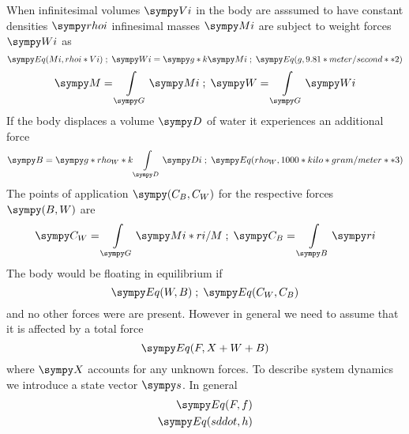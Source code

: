 When infinitesimal volumes $\s{Vi}$ in the body are asssumed to have constant densities $\s{rhoi}$ infinesimal masses $\s{Mi}$ are subject to weight forces $\s{Wi}$ as
\begin{equation*}
\s{Eq(Mi, rhoi * Vi)} \;;\; \s{Wi} =  \s{g * k} \s{Mi} \;;\; \s{Eq(g, 9.81 * meter/second**2)}
\end{equation*}
\begin{equation}
\s{M} = \int\limits_{\s{G}} \s{Mi} \;;\; \s{W} = \int\limits_{\s{G}} \s{Wi}
\label{eq:maw}
\end{equation}
If the body displaces a volume $\s{D}$ of water it experiences an additional force
$$\s{B} = \s{g * rho_W *  k}\int\limits_{\s{D}} \s{Di} \;;\; \s{Eq(rho_W, 1000 * kilo * gram/meter**3)}$$
The points of application $\s{(C_B, C_W)}$ for the respective forces $\s{(B, W)}$ are
\begin{equation}
	\s{C_W} = \int\limits_{\s{G}} \s{Mi * ri / M} \;;\; \s{C_B} = \int\limits_{\s{B}} \s{ri} 
\label{eq:poa}
\end{equation}
The body would be floating in equilibrium if
$$\s{Eq(W, B)} \;;\; \s{Eq(C_W, C_B)}$$
and no other forces were are present.  
However in general we need to assume that it is affected by a total force
\begin{equation*}
\s{Eq(F, X + W + B)}
\end{equation*}
where $\s{X}$ accounts for any unknown forces.
To describe system dynamics we introduce a state vector $\s{s}$.
In general
\begin{equation}
	\begin{split}
		\s{Eq(F, f)} \\
		\s{Eq(sddot, h)} \\
\end{split}
	\label{eq:eom}
\end{equation}

